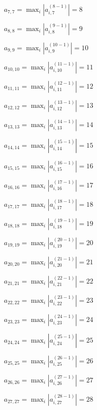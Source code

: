 \documentclass[a4paper,12pt]{article}
\begin{document}
$a _{ 7, 7 } =  \max _i |a _{ i, 7 } ^{ (8 - 1) } | = 8$

$a _{ 8, 8 } =  \max _i |a _{ i, 8 } ^{ (9 - 1) } | = 9$

$a _{ 9, 9 } =  \max _i |a _{ i, 9 } ^{ (10 - 1) } | = 10$

$a _{ 10, 10 } =  \max _i |a _{ i, 10 } ^{ (11 - 1) } | = 11$

$a _{ 11, 11 } =  \max _i |a _{ i, 11 } ^{ (12 - 1) } | = 12$

$a _{ 12, 12 } =  \max _i |a _{ i, 12 } ^{ (13 - 1) } | = 13$

$a _{ 13, 13 } =  \max _i |a _{ i, 13 } ^{ (14 - 1) } | = 14$

$a _{ 14, 14 } =  \max _i |a _{ i, 14 } ^{ (15 - 1) } | = 15$

$a _{ 15, 15 } =  \max _i |a _{ i, 15 } ^{ (16 - 1) } | = 16$

$a _{ 16, 16 } =  \max _i |a _{ i, 16 } ^{ (17 - 1) } | = 17$

$a _{ 17, 17 } =  \max _i |a _{ i, 17 } ^{ (18 - 1) } | = 18$

$a _{ 18, 18 } =  \max _i |a _{ i, 18 } ^{ (19 - 1) } | = 19$

$a _{ 19, 19 } =  \max _i |a _{ i, 19 } ^{ (20 - 1) } | = 20$

$a _{ 20, 20 } =  \max _i |a _{ i, 20 } ^{ (21 - 1) } | = 21$

$a _{ 21, 21 } =  \max _i |a _{ i, 21 } ^{ (22 - 1) } | = 22$

$a _{ 22, 22 } =  \max _i |a _{ i, 22 } ^{ (23 - 1) } | = 23$

$a _{ 23, 23 } =  \max _i |a _{ i, 23 } ^{ (24 - 1) } | = 24$

$a _{ 24, 24 } =  \max _i |a _{ i, 24 } ^{ (25 - 1) } | = 25$

$a _{ 25, 25 } =  \max _i |a _{ i, 25 } ^{ (26 - 1) } | = 26$

$a _{ 26, 26 } =  \max _i |a _{ i, 26 } ^{ (27 - 1) } | = 27$

$a _{ 27, 27 } =  \max _i |a _{ i, 27 } ^{ (28 - 1) } | = 28$
\end{document}

